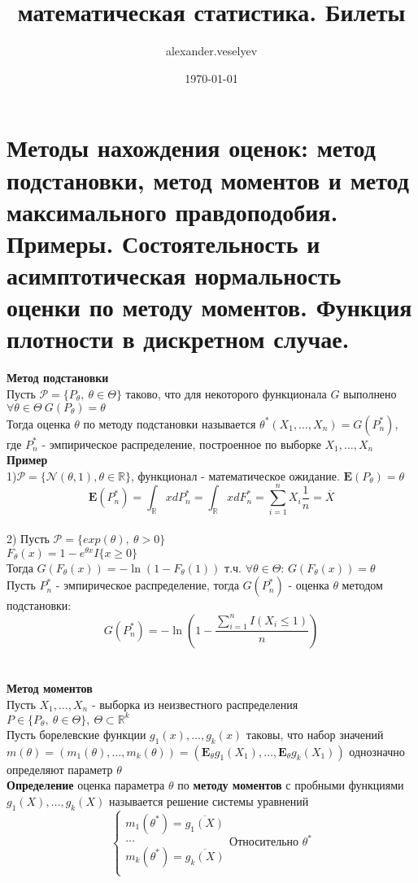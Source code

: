 \documentclass[25pt]{article}
\title{математическая статистика. Билеты}
\author{alexander.veselyev }
\date{\today}
\begin{document}
\section{Методы нахождения оценок: метод подстановки, метод моментов и метод 
максимального правдоподобия. Примеры. Состоятельность и асимптотическая нормальность
оценки по методу моментов. Функция плотности в дискретном случае.}

\textbf{Метод подстановки}
\\
Пусть $\mathcal{P} = \{ P_\theta,\ \theta \in \Theta \}$ таково, что для некоторого функционала $G$ 
выполнено $\forall \theta \in \Theta \ G(P_\theta) = \theta$\\
Тогда оценка $\theta$ по методу подстановки называется $\theta^*(X_1,\dots,X_n) = G(P_n^*)$, где
$P_n^*$ - эмпирическое распределение, построенное по выборке $X_1,\dots,X_n$\\
\textbf{Пример}\\
1)$\mathcal{P} = \{\mathcal{N}(\theta, 1), \theta \in \mathbb{R}\}$, функционал - математическое ожидание. 
$\textbf{E}(P_\theta) = \theta$
$$\textbf{E}(P_n^*) = \int_\mathbb{R}{x dP_n^*} = \int_\mathbb{R}{x d F_n^*} = \sum_{i=1}^n{X_i}\frac{1}{n} = \overline{X}$$
\\
2) Пусть $\mathcal{P} = \{exp(\theta),\  \theta > 0\}$ \\
$F_\theta(x) = 1 - e^{\theta x}I\{x\geq0\}$\\
Тогда $G(F_\theta(x)) = -\ln(1 - F_\theta(1))$ т.ч. $\forall \theta \in \Theta$: $G(F_\theta(x)) = \theta$\\
Пусть $P_n^*$ - эмпирическое распределение, тогда $G(P_n^*)$ - оценка $\theta$ методом подстановки:
$$G(P_n^*) = -\ln(1 - \frac{\sum_{i=1}^n I(X_i\leq1)}{n})$$
\\ \\
\textbf{Метод моментов}
\\
Пусть $X_1,\dots,X_n$ - выборка из неизвестного распределения $P \in \{P_\theta,\ \theta \in \Theta\},\ \Theta \subset \mathbb{R}^k$\\
Пусть борелевские функции $g_1(x),\dots,g_k(x)$ таковы, что набор значений\\
$m(\theta) = (m_1(\theta),\dots,m_k(\theta)) = (\textbf{E}_\theta g_1(X_1),\dots,\textbf{E}_\theta g_k(X_1))$ однозначно определяют параметр $\theta$\\
\textbf{Определение} оценка параметра $\theta$ по \textbf{методу моментов} с пробными функциями $g_1(X),\dots,g_k(X)$ называется решение системы уравнений
\begin{equation*}
    \begin{cases}
        m_1(\theta^*) = \overline{g_1(X)}\\
        \dots\\
        m_k(\theta^*) = \overline{g_k(X)}\\
    \end{cases}
    \text{Относительно } \theta^*
\end{equation*}
\end{document}
